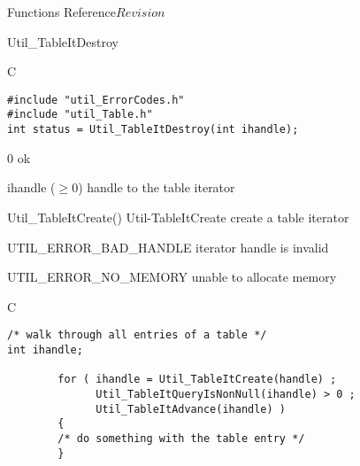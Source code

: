 \begin{cactuspart}{ Functions Reference}{}{$Revision$}
\begin{FunctionDescription}{Util\_TableItDestroy}
\begin{SynopsisSection}
\begin{Synopsis}{C}
\begin{verbatim}
#include "util_ErrorCodes.h"
#include "util_Table.h"
int status = Util_TableItDestroy(int ihandle);
\end{verbatim}
\end{Synopsis}
\end{SynopsisSection}

\begin{ResultSection}
\begin{Result}{\rm 0}
ok
\end{Result}
\end{ResultSection}

\begin{ParameterSection}
\begin{Parameter}{ihandle ($\ge 0$)}
handle to the table iterator
\end{Parameter}
\end{ParameterSection}

\begin{Discussion}
\end{Discussion}

\begin{SeeAlsoSection}
\begin{SeeAlso2} {Util\_TableItCreate()} {Util-TableItCreate}
create a table iterator
\end{SeeAlso2}
\end{SeeAlsoSection}

\begin{ErrorSection}
\begin{Error}{UTIL\_ERROR\_BAD\_HANDLE}
iterator handle is invalid
\end{Error}
\begin{Error}{UTIL\_ERROR\_NO\_MEMORY}
unable to allocate memory
\end{Error}
\end{ErrorSection}

\begin{ExampleSection}
\begin{Example}{C}
\begin{verbatim}
/* walk through all entries of a table */
int ihandle;

        for ( ihandle = Util_TableItCreate(handle) ;
              Util_TableItQueryIsNonNull(ihandle) > 0 ;
              Util_TableItAdvance(ihandle) )
        {
        /* do something with the table entry */
        }


\end{verbatim}
\end{Example}
\end{ExampleSection}
\end{FunctionDescription}
\end{cactuspart}
